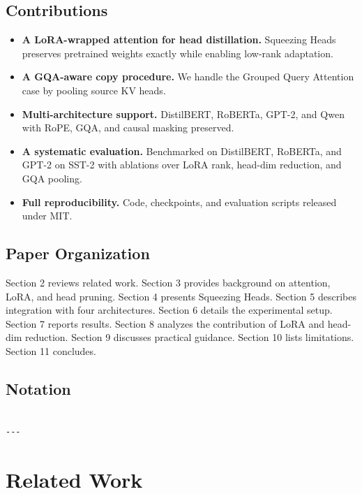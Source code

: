\subsection{Contributions}

\begin{itemize}
\item \textbf{A LoRA-wrapped attention for head distillation.} Squeezing Heads
  preserves pretrained weights exactly while enabling low-rank adaptation.
\item \textbf{A GQA-aware copy procedure.} We handle the Grouped Query Attention
  case by pooling source KV heads.
\item \textbf{Multi-architecture support.} DistilBERT, RoBERTa, GPT-2, and Qwen with
  RoPE, GQA, and causal masking preserved.
\item \textbf{A systematic evaluation.} Benchmarked on DistilBERT, RoBERTa, and GPT-2
  on SST-2 with ablations over LoRA rank, head-dim reduction, and GQA
  pooling.
\item \textbf{Full reproducibility.} Code, checkpoints, and evaluation scripts
  released under MIT.

\end{itemize}
\subsection{Paper Organization}

Section 2 reviews related work. Section 3 provides background on attention, 
LoRA, and head pruning. Section 4 presents Squeezing Heads. Section 5 
describes integration with four architectures. Section 6 details the 
experimental setup. Section 7 reports results. Section 8 analyzes the 
contribution of LoRA and head-dim reduction. Section 9 discusses practical 
guidance. Section 10 lists limitations. Section 11 concludes.



\subsection{Notation}

\begin{lstlisting}

---
\end{lstlisting}


\section{Related Work}

